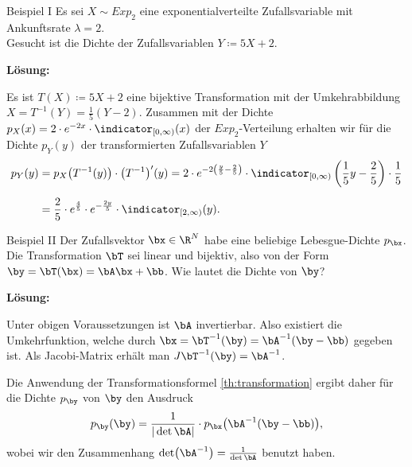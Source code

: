 \begin{frame}{Beispiel I}{}
	Es sei $X \sim Exp_2$ eine exponentialverteilte Zufallsvariable mit Ankunftsrate $\lambda = 2$. \\
	Gesucht ist die Dichte der Zufallsvariablen $Y \coloneqq 5X + 2$.
	
	\begin{boxGray}
		\textbf{Lösung:}
		
		Es ist $T(X) \coloneqq 5X + 2$ eine bijektive Transformation mit der Umkehrabbildung
		$X = T^{-1}(Y) = \frac{1}{5}(Y - 2)$.
		Zusammen mit der Dichte $p_X(x) = 2 \cdot e^{-2 x} \cdot \indicator_{[0, \infty)}(x)$ der $Exp_2$-Verteilung
		erhalten wir für die Dichte $p_Y(y)$ der transformierten Zufallsvariablen $Y$
		\begin{align*}
			p_Y(y)
				&= p_X\bigl( T^{-1}(y) \bigr) \cdot \bigl( T^{-1} \bigr)'(y)
					= 2 \cdot e^{-2 \left( \frac{y}{5} - \frac{2}{5} \right)}
						\cdot \indicator_{[0, \infty)}\left(\frac{1}{5} y - \frac{2}{5} \right) \cdot \frac{1}{5}
		\\[2mm]
				&= \frac{2}{5} \cdot e^{\frac{4}{5}} \cdot e^{-\frac{2 y}{5}} \cdot \indicator_{[2, \infty)}(y).
		\end{align*}
	\end{boxGray}
\end{frame}


\begin{frame}{Beispiel II}{}
	Der Zufallsvektor $\bx \in \R^N$ habe eine beliebige Lebesgue-Dichte $p_{\bx}$. Die Transformation $\bT$ sei linear und bijektiv,
	also von der Form $\by = \bT(\bx) = \bA \bx + \bb$. Wie lautet die Dichte von $\by$?
	
	\begin{boxGray}
		\textbf{Lösung:}
		
		Unter obigen Voraussetzungen ist $\bA$ invertierbar. Also existiert die Umkehrfunktion, welche durch
		$\bx = \bT^{-1}(\by) = \bA^{-1} (\by - \bb)$ gegeben ist. Als Jacobi-Matrix erhält man $J\bT^{-1}(\by) = \bA^{-1}$.
		
		Die Anwendung der Transformationsformel \ref{th:transformation} ergibt daher für die Dichte $p_{\by}$ von $\by$
		den Ausdruck
		\begin{equation*}
			p_{\by}(\by) = \frac{1}{\vert \det \bA \vert} \cdot p_{\bx}\bigl( \bA^{-1} (\by - \bb) \bigr),
		\end{equation*}
		wobei wir den Zusammenhang $\det\bigl( \bA^{-1} \bigr) = \frac{1}{\det \bA}$ benutzt haben.
	\end{boxGray}
\end{frame}


